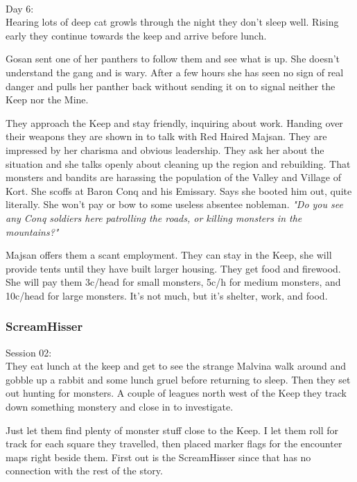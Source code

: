 \

Day 6:\\
Hearing lots of deep cat growls through the night they don't sleep well. Rising early they continue towards the keep and arrive before lunch.

\begin{readoutloud}
Gosan sent one of her panthers to follow them and see what is up. She doesn't understand the gang and is wary. After a few hours she has seen no sign of real danger and pulls her panther back without sending it on to signal neither the Keep nor the Mine.
\end{readoutloud}

They approach the Keep and stay friendly, inquiring about work. Handing over their weapons they are shown in to talk with Red Haired Majsan. They are impressed by her charisma and obvious leadership. They ask her about the situation and she talks openly about cleaning up the region and rebuilding. That monsters and bandits are harassing the population of the Valley and Village of Kort. She scoffs at Baron Conq and his Emissary. Says she booted him out, quite literally. She won't pay or bow to some useless absentee nobleman. \textit{"Do you see any Conq soldiers here patrolling the roads, or killing monsters in the mountains?"}

Majsan offers them a scant employment. They can stay in the Keep, she will provide tents until they have built larger housing. They get food and firewood. She will pay them 3c/head for small monsters, 5c/h for medium monsters, and 10c/head for large monsters. It's not much, but it's shelter, work, and food.


\subsubsection*{ScreamHisser}
\forceindent Session 02:\\                                              %
They eat lunch at the keep and get to see the strange Malvina walk around and gobble up a rabbit and some lunch gruel before returning to sleep. Then they set out hunting for monsters.
A couple of leagues north west of the Keep they track down something monstery and close in to investigate.

\begin{readoutloud}
Just let them find plenty of monster stuff close to the Keep. I let them roll for track for each square they travelled, then placed marker flags for the encounter maps right beside them. First out is the ScreamHisser since that has no connection with the rest of the story.
\end{readoutloud}

